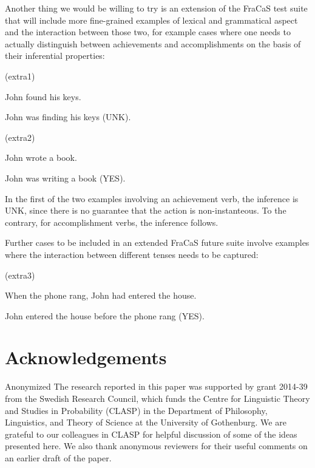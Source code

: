 \documentclass[a4paper,11pt]{article}
\newcommand\hyp{\item[H]}
\newcommand\fracasex[2]{\begin{lingex}\item[(#1)] \begin{subex} #2 \end{subex} \end{lingex} }
\begin{document}
Another thing we would be willing to try is an extension of the FraCaS test suite that will include more fine-grained examples of lexical and grammatical aspect and  the interaction between those two, for example cases where one needs to actually distinguish between achievements and accomplishments on the basis of their inferential properties: 

\fracasex{extra1}{
	\item	John found his keys.  
	\hyp 	John was finding his keys  (UNK).
}

\fracasex{extra2}{
	\item	John wrote a book.  
	\hyp 	John was writing a book  (YES).
}

In the first of the two examples involving an achievement verb, the inference is UNK, since there is no guarantee that the action is non-instanteous. To the contrary, for accomplishment verbs, the inference follows. 


Further cases to be included in an extended FraCaS future suite involve examples where the interaction between different tenses needs to be captured:

\fracasex{extra3}{
	\item	When the phone rang, John had entered the house.  
	\hyp 	John entered the house before the phone rang (YES).
}




\section*{Acknowledgements}

\ifanon
Anonymized
\else
The research reported in this paper was supported by grant 2014-39 from the
Swedish Research Council, which funds the Centre for Linguistic Theory and
Studies in Probability (CLASP) in the Department of Philosophy, Linguistics,
and Theory of Science at the University of Gothenburg. We are grateful to
our colleagues in CLASP for helpful discussion of some of the ideas presented
here. We also thank anonymous reviewers for their useful comments on an
earlier draft of the paper.
\fi

\end{document}
